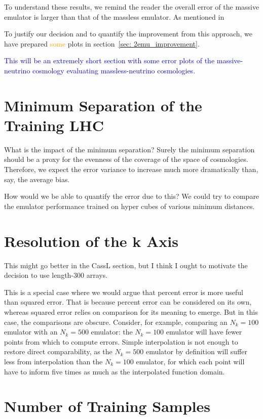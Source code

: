 To understand these results, we remind the reader the overall error of the
massive emulator is larger than that of the massless emulator. As mentioned
in 

To justify our decision and to quantify the improvement from this approach, we
have prepared \textcolor{orange}{some} plots in
section~\ref{sec: 2emu_improvement}.

\textcolor{blue}{This will be an extremely short section with some error
plots of the massive-neutrino cosmology evaluating massless-neutrino
cosmologies.}

\section{Minimum Separation of the Training LHC}
\label{sec: error_from_lhc}

What is the impact of the minimum separation? Surely the minimum separation
should be a proxy for the evenness of the coverage of the space of
cosmologies. Therefore, we expect the error variance to increase much more
dramatically than, say, the average bias.

How would we be able to quantify the error due to this? We could try to 
compare the emulator performance trained on hyper cubes of various minimum 
distances.

\section{Resolution of the k Axis}

This might go better in the CassL section, but I think I ought to motivate the 
decision to use length-300 arrays.

This is a special case where we would argue that percent error is more useful 
than squared error.
That is because percent error can be considered on its own, whereas squared
error relies on comparison for its meaning to emerge. But in this case, the
comparisons are obscure. Consider, for example, comparing an $N_k = 100$
emulator with an $N_k = 500$ emulator: the $N_k = 100$ emulator will have
fewer points from which to compute errors. Simple interpolation is not enough
to restore direct comparability, as the $N_k = 500$ emulator by definition
will suffer less from interpolation than the $N_k = 100$ emulator, for which
each point will have to inform five times as much as the interpolated function
domain.

\section{Number of Training Samples}
\label{sec: num_samples}

